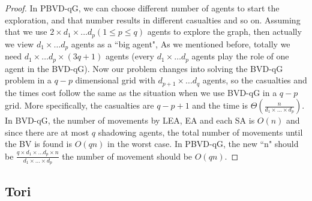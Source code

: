 \begin{proof}
In PBVD-qG, we can choose different number of agents to start the exploration, and that number results in different casualties and so on. Assuming that we use $2\times d_1\times \ldots d_p (1\leq p\leq q)$ agents to explore the graph, then actually we view $d_1\times \ldots d_p$ agents as a ``big agent", As we mentioned before, totally we need $d_1\times \ldots d_p\times (3q+1)$ agents (every $d_1\times\ldots d_p$ agents play the role of one agent in the BVD-qG). Now our problem changes into solving the BVD-qG problem in a $q-p$ dimensional grid with $d_{p+1}\times \ldots d_q$ agents, so the casualties and the times cost follow the same as the situation when we use BVD-qG in a $q-p$ grid. More specifically, the casualties are $q-p+1$ and the time is $\Theta(\frac{n}{d_1\times\ldots\times d_p})$. In BVD-qG, the number of movements by LEA, EA and each SA is $O(n)$ and since there are at most $q$ shadowing agents, the total number of movements until the BV is found is $O(qn)$ in the worst case. In PBVD-qG, the new ``n" should be $\frac{q\times d_1\times\ldots d_p\times n}{d_1\times\ldots\times d_p}$ the number of movement should be $O(qn)$.  
\end{proof}

\subsection{Tori}

